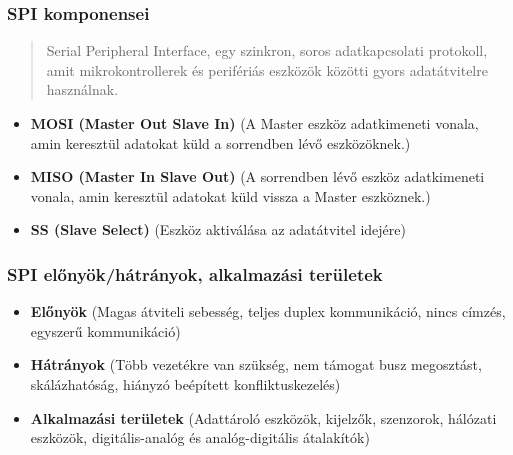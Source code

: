 \subsubsection{SPI komponensei}
\begin{quote}
    Serial Peripheral Interface, egy szinkron, soros adatkapcsolati protokoll, amit mikrokontrollerek és perifériás eszközök közötti gyors adatátvitelre használnak.
\end{quote}
\begin{itemize}
    \item \textbf{MOSI (Master Out Slave In)} (A Master eszköz adatkimeneti vonala, amin keresztül adatokat küld a sorrendben lévő eszközöknek.) 
    \item \textbf{MISO (Master In Slave Out)} (A sorrendben lévő eszköz adatkimeneti vonala, amin keresztül adatokat küld vissza a Master eszköznek.) 
    \item \textbf{SS (Slave Select)} (Eszköz aktiválása az adatátvitel idejére)
\end{itemize}

\subsubsection{SPI előnyök/hátrányok, alkalmazási területek}
\begin{itemize}
    \item \textbf{Előnyök} (Magas átviteli sebesség, teljes duplex kommunikáció, nincs címzés, egyszerű kommunikáció)
    \item \textbf{Hátrányok} (Több vezetékre van szükség, nem támogat busz megosztást, skálázhatóság, hiányzó beépített konfliktuskezelés)
    \item \textbf{Alkalmazási területek} (Adattároló eszközök, kijelzők, szenzorok, hálózati eszközök, digitális-analóg és analóg-digitális átalakítók)
\end{itemize}

\clearpage
